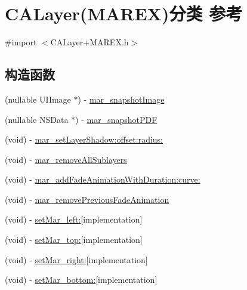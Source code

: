 \hypertarget{category_c_a_layer_07_m_a_r_e_x_08}{}\section{C\+A\+Layer(M\+A\+R\+EX)分类 参考}
\label{category_c_a_layer_07_m_a_r_e_x_08}


{\ttfamily \#import $<$C\+A\+Layer+\+M\+A\+R\+E\+X.\+h$>$}

\subsection*{构造函数}
\begin{DoxyCompactItemize}
\item 
(nullable U\+I\+Image $\ast$) -\/ \hyperlink{category_c_a_layer_07_m_a_r_e_x_08_a7dd68d642ed373b04b6babd27c867d7e}{mar\+\_\+snapshot\+Image}
\item 
(nullable N\+S\+Data $\ast$) -\/ \hyperlink{category_c_a_layer_07_m_a_r_e_x_08_ad6ed2ae5dce7e99c7c7cec4fb4436601}{mar\+\_\+snapshot\+P\+DF}
\item 
(void) -\/ \hyperlink{category_c_a_layer_07_m_a_r_e_x_08_a645d290585a277a15dd6d34c9943cb64}{mar\+\_\+set\+Layer\+Shadow\+:offset\+:radius\+:}
\item 
(void) -\/ \hyperlink{category_c_a_layer_07_m_a_r_e_x_08_a0725d26153d21fc6679defe7ea096569}{mar\+\_\+remove\+All\+Sublayers}
\item 
(void) -\/ \hyperlink{category_c_a_layer_07_m_a_r_e_x_08_a3d4a7832d9c52b20d70113e226f6bf15}{mar\+\_\+add\+Fade\+Animation\+With\+Duration\+:curve\+:}
\item 
(void) -\/ \hyperlink{category_c_a_layer_07_m_a_r_e_x_08_a2a53c03963b6e530593b3024e33f78fc}{mar\+\_\+remove\+Previous\+Fade\+Animation}
\item 
(void) -\/ \hyperlink{category_c_a_layer_07_m_a_r_e_x_08_af86e2e41a31a56fafcf3401d8e92600f}{set\+Mar\+\_\+left\+:}{\ttfamily  \mbox{[}implementation\mbox{]}}
\item 
(void) -\/ \hyperlink{category_c_a_layer_07_m_a_r_e_x_08_a1cf55fcc89b1f1b8238a9c1a1038a078}{set\+Mar\+\_\+top\+:}{\ttfamily  \mbox{[}implementation\mbox{]}}
\item 
(void) -\/ \hyperlink{category_c_a_layer_07_m_a_r_e_x_08_a72fd0e1a26914573dc01e62e404299a7}{set\+Mar\+\_\+right\+:}{\ttfamily  \mbox{[}implementation\mbox{]}}
\item 
(void) -\/ \hyperlink{category_c_a_layer_07_m_a_r_e_x_08_aede117d51fd12a8d7190632e40ed0c13}{set\+Mar\+\_\+bottom\+:}{\ttfamily  \mbox{[}implementation\mbox{]}}

\end{DoxyCompactItemize}
